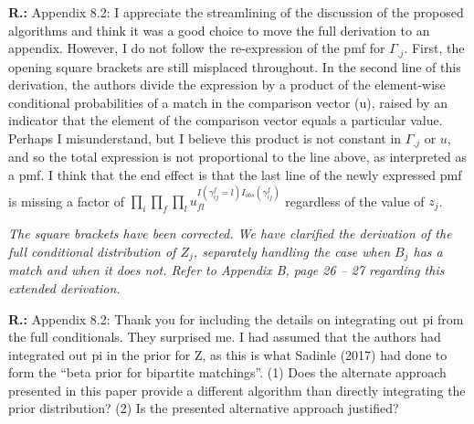 \documentclass[letterpaper, parskip]{scrartcl}
\newcommand{\pointRaised}[2]{%
	\textbf{#1.\theresponsectr:} #2
}
\newcounter{responsectr}[section]     %
\newcommand{\reply}[1]{%
	\refstepcounter{responsectr}%
		\begin{tcolorbox}
			\itshape #1
		\end{tcolorbox}
}
\begin{document}
	\pointRaised{R}{%
	Appendix 8.2: I appreciate the streamlining of the discussion of the proposed algorithms and think it was a good choice to move the full derivation to an appendix. However, I do not follow the re-expression of the pmf for $\Gamma_{.j}$. First, the opening square brackets are still misplaced
	throughout. In the second line of this derivation, the authors divide the expression by a product of the element-wise conditional probabilities of a match in the comparison vector (u), raised by an indicator that the element of the comparison vector equals a particular value. Perhaps I misunderstand, but I believe this product is not constant in $\Gamma_{.j}$ or $u$, and so the total expression is not proportional to the line above, as interpreted as a pmf. I think that the end effect is that the last line of the newly expressed pmf is missing a factor of $\prod_i \prod_f \prod_l u_{fl}^{I(\gamma_{ij}^f = l) I_{obs}(\gamma_{ij}^f)}$ regardless of the value of $z_j$.}
	
	

\reply{%
	The square brackets have been corrected. We have clarified the derivation of the full conditional distribution of $Z_j$, separately handling the case when $B_j$ has a match and when it does not. Refer to Appendix B, page 26 -- 27 regarding this extended derivation.
	}



	\pointRaised{R}{%
Appendix 8.2: Thank you for including the details on integrating out pi from the full conditionals. They surprised me. I had assumed that the authors had integrated out pi in the prior for Z, as this is what Sadinle (2017) had done to form the “beta prior for bipartite matchings”. (1) Does the alternate approach presented in this paper provide a different algorithm than directly integrating the prior distribution? (2) Is the presented alternative approach justified?}
\end{document}
